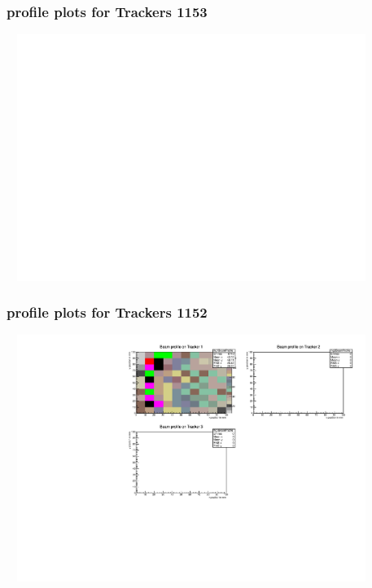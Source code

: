 \documentclass[slidestop,compress,mathserif]{beamer}
\begin{document}
\begin{frame}\frametitle{profile plots for Trackers 1153}
	 \includegraphics[width=12cm,height=8cm]{profile_plots_for_Trackers_1153.pdf}
\end{frame}
\begin{frame}\frametitle{profile plots for Trackers 1152}
	 \includegraphics[width=12cm,height=8cm]{profile_plots_for_Trackers_1152.pdf}
\end{frame}
\end{document}
